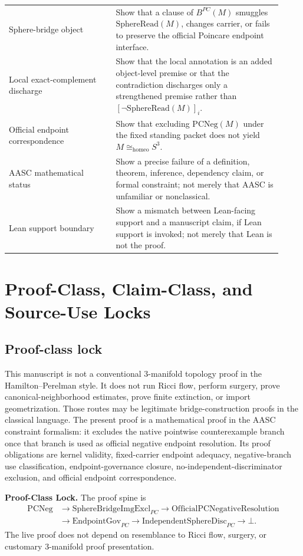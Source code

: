 \documentclass[11pt]{article}
\newcommand{\Sthree}{S^{3}}
\newcommand{\SphereRead}{\mathrm{SphereRead}}
\newcommand{\OfficialPCNegativeResolution}{\mathrm{OfficialPCNegativeResolution}}
\newcommand{\PCNeg}{\mathrm{PCNeg}}
\newcommand{\SphereBridgeImgExcl}{\mathrm{SphereBridgeImgExcl}_{PC}}
\newcommand{\EndpointGov}{\mathrm{EndpointGov}_{PC}}
\newcommand{\IndependentSphereDisc}{\mathrm{IndependentSphereDisc}_{PC}}
\newcommand{\BridgeObjPC}{B^{PC}}
\newcommand{\Homeo}{\cong_{\mathrm{homeo}}}
\begin{document}
\begin{longtable}{L{0.36\linewidth}L{0.56\linewidth}}
Sphere-bridge object & Show that a clause of \(\BridgeObjPC(M)\) smuggles \(\SphereRead(M)\), changes carrier, or fails to preserve the official Poincare endpoint interface.\\
Local exact-complement discharge & Show that the local annotation is an added object-level premise or that the contradiction discharges only a strengthened premise rather than \([\neg\SphereRead(M)]_i\).\\
Official endpoint correspondence & Show that excluding \(\PCNeg(M)\) under the fixed standing packet does not yield \(M\Homeo\Sthree\).\\
AASC mathematical status & Show a precise failure of a definition, theorem, inference, dependency claim, or formal constraint; not merely that AASC is unfamiliar or nonclassical.\\
Lean support boundary & Show a mismatch between Lean-facing support and a manuscript claim, if Lean support is invoked; not merely that Lean is not the proof.\\
\bottomrule
\end{longtable}

\tableofcontents
\newpage
{}

\section{Proof-Class, Claim-Class, and Source-Use Locks}

\subsection{Proof-class lock}
This manuscript is not a conventional 3-manifold topology proof in the Hamilton--Perelman style. It does not run Ricci flow, perform surgery, prove canonical-neighborhood estimates, prove finite extinction, or import geometrization. Those routes may be legitimate bridge-construction proofs in the classical language. The present proof is a mathematical proof in the AASC constraint formalism: it excludes the native pointwise counterexample branch once that branch is used as official negative endpoint resolution. Its proof obligations are kernel validity, fixed-carrier endpoint adequacy, negative-branch use classification, endpoint-governance closure, no-independent-discriminator exclusion, and official endpoint correspondence.

\begin{mdframed}[backgroundcolor=gray!8,linewidth=0.6pt]
\textbf{Proof-Class Lock.} The proof spine is
\[
\begin{aligned}
\PCNeg&\to\SphereBridgeImgExcl\to\OfficialPCNegativeResolution\\
&\to\EndpointGov\to\IndependentSphereDisc\to\bot.
\end{aligned}
\]
The live proof does not depend on resemblance to Ricci flow, surgery, or customary 3-manifold proof presentation.
\end{mdframed}
\end{document}
